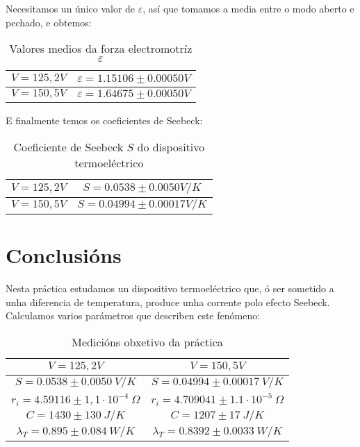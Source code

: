 \documentclass[12pt, a4paper, titlepage]{article}
\begin{document}
  Necesitamos un único valor de $\varepsilon$, así que tomamos a media entre o modo aberto e pechado, e obtemos:
  \begin{table}[H]
    \centering
    \begin{tabular}{|c|c|}
      \hline
      $\mathit{V = 125,2V}$ & $\varepsilon = 1.15106 \pm 0.00050 V$ \\ \hline
      $\mathit{V = 150,5V}$ & $\varepsilon = 1.64675 \pm 0.00050 V$ \\ \hline
    \end{tabular}
    \caption{Valores medios da forza electromotríz $\varepsilon$}
  \end{table}

  E finalmente temos os coeficientes de Seebeck:
  \begin{table}[H]
    \centering
    \begin{tabular}{|c|c|}
      \hline
      $\mathit{V = 125,2V}$ & $S = 0.0538 \pm 0.0050 V/K$ \\ \hline
      $\mathit{V = 150,5V}$ & $S = 0.04994 \pm 0.00017 V/K$ \\ \hline
    \end{tabular}
    \caption{Coeficiente de Seebeck $S$ do dispositivo termoeléctrico}
  \end{table}


  \newpage
  \part{Conclusións}

  Nesta práctica estudamos un dispositivo termoeléctrico que, ó ser sometido a unha diferencia de temperatura, produce unha corrente polo efecto Seebeck.
  Calculamos varios parámetros que describen este fenómeno:
  \begin{table}[H]
    \centering
    \begin{tabular}{|c|c|}
      \hline
      $\mathit{V = 125,2V}$ & $\mathit{V = 150,5V}$ \\ \hline
      $S = 0.0538 \pm 0.0050 \ V/K$ & $S = 0.04994 \pm 0.00017 \ V/K$ \\ \hline
      $r_i = 4.59116 \pm 1,1 \cdot 10^{-4} \ \Omega$ & $r_i = 4.709041 \pm 1.1 \cdot 10^{-5} \ \Omega$\\ \hline
      $C = 1430 \pm 130 \ J/K$ & $C = 1207 \pm 17 \ J/K$ \\ \hline
      $\lambda_T = 0.895 \pm 0.084 \ W/K$ & $\lambda_T = 0.8392 \pm 0.0033 \ W/K$ \\ \hline
    \end{tabular}
    \caption{Medicións obxetivo da práctica}
  \end{table}
\end{document}
